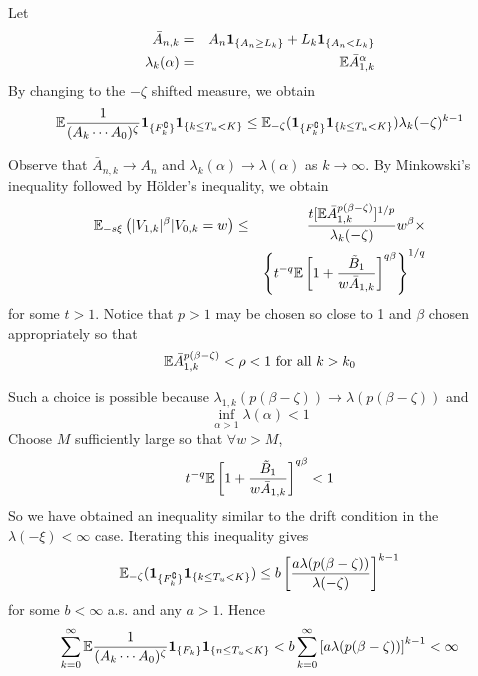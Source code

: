 \documentclass{beamer}
\begin{document}
\begin{frame}
  Let
  \begin{eqnarray*}
    \bar A_{n,k} &=& A_{n} \mathbf{1}_{\{A_n \geq L_k\}} + L_k \mathbf{1}_{\{A_n < L_k\}} \\
    \lambda_k(\alpha) &=& \mathbb{E} \bar A_{1,k}^\alpha
  \end{eqnarray*}
  By changing to the $-\zeta$ shifted measure, we obtain
  \[
  \mathbb{E} {
    1\over
    (A_k \cdots A_0)^\zeta
  } \mathbf{1}_{\{F_k^\complement\}} \mathbf{1}_{\{k \leq T_u < K\}}
  \leq \mathbb{E}_{-\zeta}(\mathbf{1}_{\{F_k^\complement\}} \mathbf{1}_{\{k \leq T_u < K\}})
  \lambda_k(-\zeta)^{k-1} 
  \]
\end{frame}

\begin{frame}
  Observe that $\bar A_{n,k} \to A_n$ and $\lambda_k(\alpha) \to
  \lambda(\alpha)$ as $k \to \infty$. By Minkowski's inequality
  followed by H\"older's inequality, we obtain
  \begin{eqnarray*}
    \mathbb{E}_{-s\xi} \left( |V_{1,k}|^\beta | V_{0,k} = w\right) &\leq& {
    t [\mathbb{E} \bar A_{1,k}^{p(\beta - \zeta)}]^{1/p}
    \over
    \lambda_k(-\zeta)
  } w^\beta \times \\
  && \left\{
    t^{-q} \mathbb{E} \left[
      1 + {
        \tilde B_1
        \over
        w \bar A_{1,k}
      }
    \right]^{q\beta}
  \right\}^{1/q}
  \end{eqnarray*}
  for some $t > 1$. Notice that $p > 1$ may be chosen so close to 1
  and $\beta$ chosen appropriately so that
  \[
  \mathbb{E} \bar A_{1,k}^{p(\beta - \zeta)} < \rho < 1 \text{ for all } k > k_0
  \]
\end{frame}

\begin{frame}
  Such a choice is possible because $\lambda_{1,k}(p(\beta - \zeta))
  \to \lambda(p(\beta - \zeta))$ and
  \[
  \inf_{\alpha > 1} \lambda(\alpha) < 1
  \]
  Choose $M$ sufficiently large so that $\forall w > M$,
  \[
    t^{-q} \mathbb{E} \left[
      1 + {
        \tilde B_1
        \over
        w \bar A_{1,k}
      }
    \right]^{q\beta} < 1
  \]
  So we have obtained an inequality similar to the drift condition in
  the $\lambda(-\xi) < \infty$ case.  Iterating this inequality gives
  \[
  \mathbb{E}_{-\zeta}(\mathbf{1}_{\{F_k^\complement\}} \mathbf{1}_{\{k \leq T_u < K\}}) \leq b \left[
  {
    a \lambda (p(\beta - \zeta))
    \over
    \lambda(-\zeta)
  }
\right]^{k-1}
  \]
  for some $b < \infty$ a.s. and any $a > 1$. Hence
  \[
  \sum_{k=0}^\infty \mathbb{E} {
    1 \over
    (A_k \cdots A_0)^\zeta
  }  \mathbf{1}_{\{F_k\}}  \mathbf{1}_{\{n \leq T_u < K\}}
  <
  b \sum_{k=0}^\infty \left[
  {
    a \lambda (p(\beta - \zeta))
  }
\right]^{k-1} < \infty
  \]

\end{frame}
\end{document}
